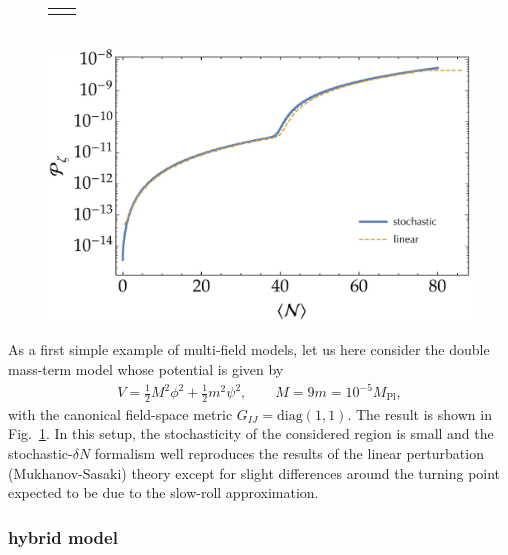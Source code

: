 \documentclass[aps, prd
, preprint
, nofootinbib 
, longbibliography
]{revtex4-1}
\newcommand{\diag}{\mathrm{diag}}
\newcommand{\Mpl}{M_\text{Pl}}
\newcommand{\bae}[1]{\begin{align} #1 \end{align}}
\begin{document}
\begin{figure}
\begin{tabular}{cc}
\begin{minipage}{0.5\hsize}
		\end{minipage}
	\end{tabular} \\[10pt]
	\includegraphics[width=0.5\hsize]{figs/double_chaotic/Pzeta_conf.pdf}
	\caption{}
	\label{figs: double_chaotic_conf}
\end{figure}

As a first simple example of multi-field models, let us here consider the double mass-term model whose potential is given by
\bae{
	V=\frac{1}{2}M^2\phi^2+\frac{1}{2}m^2\psi^2, \qquad M=9m=10^{-5}\Mpl,
}
with the canonical field-space metric $G_{IJ}=\diag(1,1)$. The result is shown in Fig.~\ref{figs: double_chaotic_conf}.
In this setup, the stochasticity of the considered region is small and the stochastic-$\delta N$ formalism well reproduces the results of the linear perturbation (Mukhanov-Sasaki) theory 
except for slight differences around the turning point expected to be due to the slow-roll approximation.



\subsubsection{hybrid model}
\end{document}
